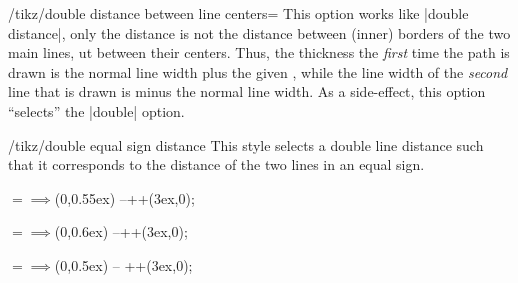 \begin{key}{/tikz/double distance between line centers=}
  This option works like |double distance|, only the distance is not
  the distance between (inner) borders of the two main lines, ut
  between their centers. Thus, the thickness the
  \emph{first} time the path is drawn is the normal line width
  plus the given , while the line width of the
  \emph{second} line that is drawn is  minus the
  normal line width. As a side-effect, this option ``selects'' the
  |double| option.

\begin{codeexample}[]
\end{codeexample}
\begin{codeexample}[]
\end{codeexample}
\end{key}

\begin{stylekey}{/tikz/double equal sign distance}
  This style selects a double line distance such that it corresponds
  to the distance of the two lines in an equal sign.
\begin{codeexample}[]
\Huge $=\implies$
                    (0,0.55ex) --++(3ex,0);
\end{codeexample}
\begin{codeexample}[]
\normalsize $=\implies$
                          (0,0.6ex) --++(3ex,0);
\end{codeexample}
\begin{codeexample}[]
\tiny $=\implies$
                   (0,0.5ex) -- ++(3ex,0);
\end{codeexample}
\end{stylekey}






